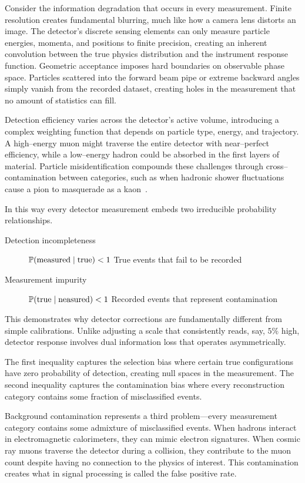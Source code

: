     Consider the information degradation that occurs in every measurement. 
    Finite resolution creates fundamental blurring, much like how a camera lens distorts an image.
    The detector's discrete sensing elements can only measure particle energies, momenta, and positions to finite precision, creating an inherent convolution between the true physics distribution and the instrument response function.
    Geometric acceptance imposes hard boundaries on observable phase space.
    Particles scattered into the forward beam pipe or extreme backward angles simply vanish from the recorded dataset, creating holes in the measurement that no amount of statistics can fill.
    
    Detection efficiency varies across the detector's active volume, introducing a complex weighting function that depends on particle type, energy, and trajectory.
    A high--energy muon might traverse the entire detector with near--perfect efficiency, while a low--energy hadron could be absorbed in the first layers of material.
    Particle misidentification compounds these challenges through cross--contamination between categories, such as when hadronic shower fluctuations cause a pion to masquerade as a kaon~\cite{belle_collaboration_precision_2013}.

    In this way every detector measurement embeds two irreducible probability relationships.
    \begin{description}
        \item [Detection incompleteness] \(\P(\text{measured}\mid\text{true}) < 1\) True events that fail to be recorded
        \item [Measurement impurity] \(\P(\text{true}\mid\text{neasured}) < 1\) Recorded events that represent contamination
    \end{description}
    This demonstrates why detector corrections are fundamentally different from simple calibrations.
    Unlike adjusting a scale that consistently reads, say, \(5\%\) high, detector response involves dual information loss that operates asymmetrically.
    
    The first inequality captures the selection bias where certain true configurations have zero probability of detection, creating null spaces in the measurement.
    The second inequality captures the contamination bias where every reconstruction category contains some fraction of misclassified events.
    
    Background contamination represents a third problem---every measurement category contains some admixture of misclassified events.
    When hadrons interact in electromagnetic calorimeters, they can mimic electron signatures.
    When cosmic ray muons traverse the detector during a collision, they contribute to the muon count despite having no connection to the physics of interest.
    This contamination creates what in signal processing is called the false positive rate.
    
